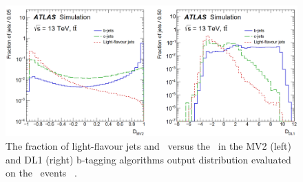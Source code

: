 \begin{figure}[bth]
	\includegraphics[width=.9\textwidth]{FTAG_plots/b-tagging-score.png}
	\caption{The fraction of light-flavour jets and \cjets\ versus 
	the \bjets\ in the MV2 (left) and
	DL1 (right) b-tagging algorithms output distribution 
	evaluated on the \ttbar\ events
	~\cite{FTAG-2018-01}.}\label{fig:b-tagging-score}
\end{figure}
